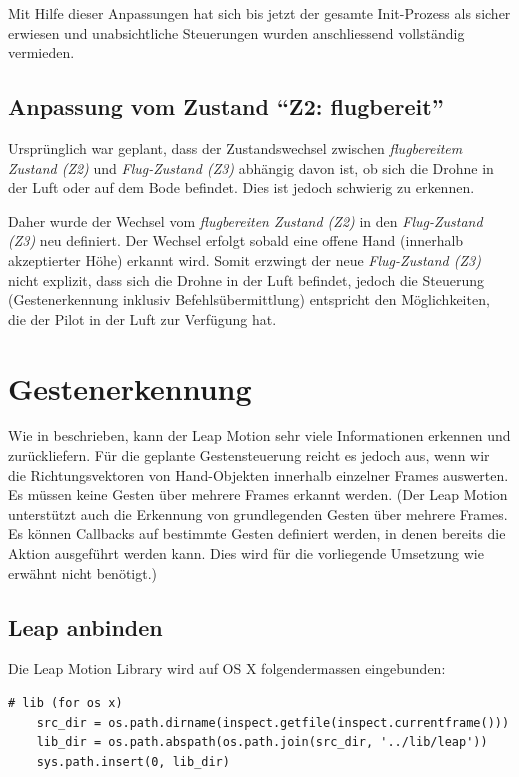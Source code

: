 Mit Hilfe dieser Anpassungen hat sich bis jetzt der gesamte Init-Prozess als sicher erwiesen und unabsichtliche Steuerungen wurden anschliessend vollständig vermieden.

\subsection{Anpassung vom Zustand "`Z2: flugbereit"'}
Ursprünglich war geplant, dass der Zustandswechsel zwischen \textit{flugbereitem Zustand (Z2)} und \textit{Flug-Zustand (Z3)} abhängig davon ist, ob sich die Drohne in der Luft oder auf dem Bode befindet.
Dies ist jedoch schwierig zu erkennen.

Daher wurde der Wechsel vom \textit{flugbereiten Zustand (Z2)} in den \textit{Flug-Zustand (Z3)} neu definiert.
Der Wechsel erfolgt sobald eine offene Hand (innerhalb akzeptierter Höhe) erkannt wird.
Somit erzwingt der neue \textit{Flug-Zustand (Z3)} nicht explizit, dass sich die Drohne in der Luft befindet, jedoch die Steuerung (Gestenerkennung inklusiv Befehlsübermittlung) entspricht den Möglichkeiten, die der Pilot in der Luft zur Verfügung hat.


\section{Gestenerkennung}
Wie in  beschrieben, kann der Leap Motion sehr viele Informationen erkennen und zurückliefern.
Für die geplante Gestensteuerung reicht es jedoch aus, wenn wir die Richtungsvektoren von Hand-Objekten innerhalb einzelner Frames auswerten.
Es müssen keine Gesten über mehrere Frames erkannt werden. (Der Leap Motion unterstützt auch die Erkennung von grundlegenden Gesten über mehrere Frames. Es können Callbacks auf bestimmte Gesten definiert werden, in denen bereits die Aktion ausgeführt werden kann. Dies wird für die vorliegende Umsetzung wie erwähnt nicht benötigt.)

\subsection{Leap anbinden}
Die Leap Motion Library wird auf OS X folgendermassen eingebunden:
\begin{lstlisting}[style=lstStyleCpp]
	# lib (for os x)
	src_dir = os.path.dirname(inspect.getfile(inspect.currentframe()))
	lib_dir = os.path.abspath(os.path.join(src_dir, '../lib/leap'))
	sys.path.insert(0, lib_dir)
\end{lstlisting}

